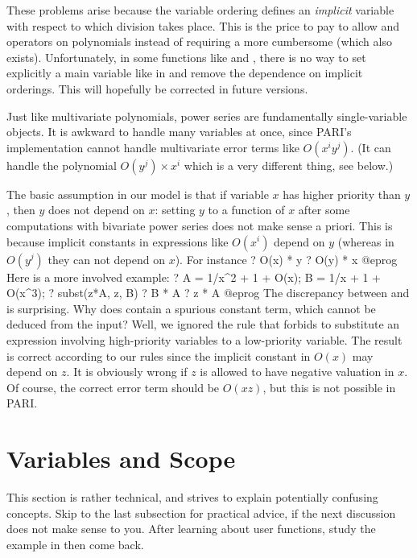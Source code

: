 These problems arise because the variable ordering defines an \emph{implicit}
variable with respect to which division takes place. This is
the price to pay to allow \kbd{\%} and \kbd{/} operators on polynomials
instead of requiring a more cumbersome 
(which also exists). Unfortunately, in some functions like  and
, there is no way to set explicitly a main variable like in
 and remove the dependence on implicit orderings. This will
hopefully be corrected in future versions.

Just like multivariate polynomials, power series are fundamentally
single-variable objects. It is awkward to handle many variables at once,
since PARI's implementation cannot handle multivariate error terms like
$O(x^i y^j)$. (It can handle the polynomial $O(y^j) \times x^i$ which is
a very different thing, see below.)

The basic assumption in our model is that if variable $x$ has higher
priority than $y$, then $y$ does not depend on $x$: setting $y$ to a
function of $x$ after some computations with bivariate power series does
not make sense a priori. This is because implicit constants in
expressions like $O(x^i)$ depend on $y$ (whereas in $O(y^j)$ they can not
depend on $x$). For instance
\bprog
  ? O(x) * y
  ? O(y) * x
@eprog\noindent
Here is a more involved example:
\bprog
  ? A = 1/x^2 + 1 + O(x); B = 1/x + 1 + O(x^3);
  ? subst(z*A, z, B)
  ? B * A
  ? z * A
@eprog\noindent
The discrepancy between  and  is surprising. Why does
 contain a spurious constant term, which cannot be
deduced from the input? Well, we ignored the rule that forbids to
substitute an expression involving high-priority variables
to a low-priority variable. The result  is correct according to
our rules since the implicit constant in $O(x)$ may depend on $z$. It is
obviously wrong if $z$ is allowed to have negative valuation in $x$. Of
course, the correct error term should be $O(xz)$, but this is not
possible in PARI.

\section{Variables and Scope}\label{se:scope}
This section is rather technical, and strives to explain potentially
confusing concepts. Skip to the last subsection for practical advice, if the
next discussion does not make sense to you. After learning about user
functions, study the example in  then come back.

